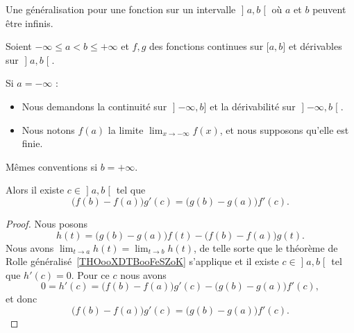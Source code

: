 Une généralisation pour une fonction sur un intervalle \( \mathopen] a , b \mathclose[\) où \( a\) et \( b\) peuvent être infinis.
\begin{theorem} \label{THOooRIIBooOjkzMa}
    Soient \( -\infty\leq a<b\leq +\infty\) et \( f,g\) des fonctions continues sur \( \mathopen[ a , b \mathclose]\) et dérivables sur \( \mathopen] a , b \mathclose[\).

        Si \( a=-\infty\) :
        \begin{itemize}
            \item Nous demandons la continuité sur \( \mathopen] -\infty , b \mathclose]\) et la dérivabilité sur \( \mathopen] -\infty , b \mathclose[\).
            \item
                Nous notons \( f(a)\) la limite \( \lim_{x\to -\infty} f(x)\), et nous supposons qu'elle est finie.
        \end{itemize}

        Mêmes conventions si \( b=+\infty\).

    Alors il existe \( c\in \mathopen] a , b \mathclose[\) tel que
        \begin{equation}
            \big( f(b)-f(a) \big)g'(c)=\big( g(b)-g(a) \big)f'(c).
        \end{equation}

\end{theorem}


\begin{proof}
    Nous posons
    \begin{equation}
        h(t)=\big( g(b)-g(a) \big)f(t)-\big( f(b)-f(a) \big)g(t).
    \end{equation}
    Nous avons \( \lim_{t\to a} h(t)=\lim_{t\to b} h(t)\), de telle sorte que le théorème de Rolle généralisé~\ref{THOooXDTBooFeSZoK} s'applique et il existe \( c\in \mathopen] a , b \mathclose[\) tel que \( h'(c)=0\). Pour ce \( c\) nous avons
    \begin{equation}
        0=h'(c)=\big( f(b)-f(a) \big)g'(c)-\big( g(b)-g(a) \big)f'(c),
    \end{equation}
   et donc
    \begin{equation}
        \big( f(b)-f(a) \big)g'(c)=\big( g(b)-g(a) \big)f'(c).
    \end{equation}
\end{proof}

